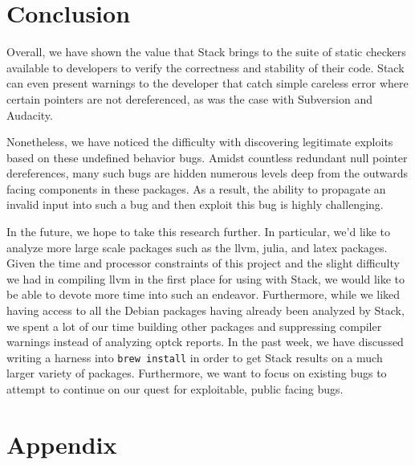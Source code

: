 \documentclass[10pt,twocolumn]{article}
\begin{document}
\section{Conclusion}
\label{sec:conclusion}
Overall, we have shown the value that Stack brings to the suite of static
checkers available to developers to verify the correctness and stability of
their code. Stack can even present warnings to the developer that catch simple
careless error where certain pointers are not dereferenced, as was the case
with Subversion and Audacity.

Nonetheless, we have noticed the difficulty with discovering legitimate
exploits based on these undefined behavior bugs. Amidst countless redundant
null pointer dereferences, many such bugs are hidden numerous levels deep from
the outwards facing components in these packages. As a result, the ability to
propagate an invalid input into such a bug and then exploit this bug is highly
challenging.

In the future, we hope to take this research further. In particular, we'd like
to analyze more large scale packages such as the llvm, julia, and latex
packages. Given the time and processor constraints of this project and the
slight difficulty we had in compiling llvm in the first place for using with
Stack, we would like to be able to devote more time into such an endeavor.
Furthermore, while we liked having access to all the Debian packages having
already been analyzed by Stack, we spent a lot of our time building other
packages and suppressing compiler warnings instead of analyzing optck reports.
In the past week, we have discussed writing a harness into \texttt{brew
install} in order to get Stack results on a much larger variety of packages.
Furthermore, we want to focus on existing bugs to attempt to continue on our
quest for exploitable, public facing bugs.



\section{Appendix}
\label{sec:appendix}
\end{document}
